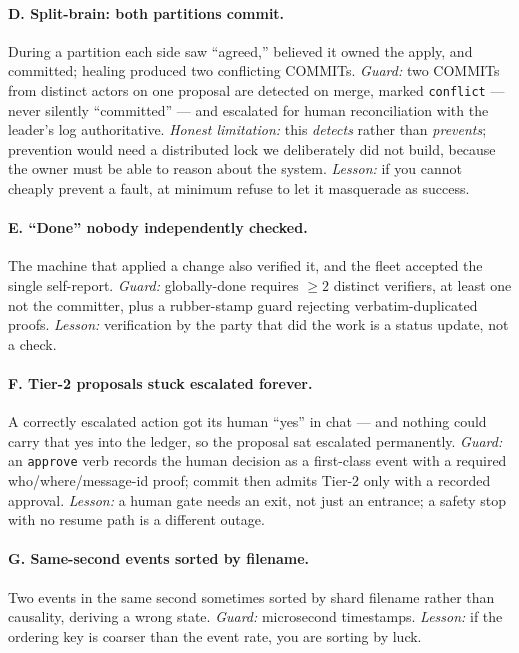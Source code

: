 \documentclass[11pt]{article}
\begin{document}
\paragraph{D. Split-brain: both partitions commit.} During a partition each side saw ``agreed,'' believed it owned the apply, and committed; healing produced two conflicting COMMITs. \emph{Guard:} two COMMITs from distinct actors on one proposal are detected on merge, marked \texttt{conflict} --- never silently ``committed'' --- and escalated for human reconciliation with the leader's log authoritative. \emph{Honest limitation:} this \emph{detects} rather than \emph{prevents}; prevention would need a distributed lock we deliberately did not build, because the owner must be able to reason about the system. \emph{Lesson:} if you cannot cheaply prevent a fault, at minimum refuse to let it masquerade as success.

\paragraph{E. ``Done'' nobody independently checked.} The machine that applied a change also verified it, and the fleet accepted the single self-report. \emph{Guard:} globally-done requires $\geq 2$ distinct verifiers, at least one not the committer, plus a rubber-stamp guard rejecting verbatim-duplicated proofs. \emph{Lesson:} verification by the party that did the work is a status update, not a check.

\paragraph{F. Tier-2 proposals stuck escalated forever.} A correctly escalated action got its human ``yes'' in chat --- and nothing could carry that yes into the ledger, so the proposal sat escalated permanently. \emph{Guard:} an \texttt{approve} verb records the human decision as a first-class event with a required who/where/message-id proof; commit then admits Tier-2 only with a recorded approval. \emph{Lesson:} a human gate needs an exit, not just an entrance; a safety stop with no resume path is a different outage.

\paragraph{G. Same-second events sorted by filename.} Two events in the same second sometimes sorted by shard filename rather than causality, deriving a wrong state. \emph{Guard:} microsecond timestamps. \emph{Lesson:} if the ordering key is coarser than the event rate, you are sorting by luck.
\end{document}
